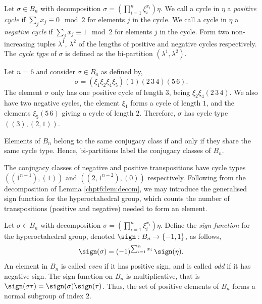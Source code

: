 \documentclass[11pt]{report}
\begin{document}
\begin{defn}
	Let $\sigma \in B_{n}$ with decomposition $\sigma = \left(\prod_{i=1}^{n} \xi_{i}^{x_{i}}\right) \eta$. We call a cycle in $\eta$ a \emph{positive cycle} if $\sum_{j}x_{j} \equiv 0 \mod 2$ for elements $j$ in the cycle. We call a cycle in $\eta$ a \emph{negative cycle} if $\sum_{j}x_{j} \equiv 1\mod 2$ for elements $j$ in the cycle.
	Form two non-increasing tuples $\lambda^{1}$, $\lambda^{2}$ of the lengths of positive and negative cycles respectively. The \emph{cycle type} of $\sigma$ is defined as the bi-partition $(\lambda^{1},\lambda^{2})$.
\end{defn}

\begin{example}
	Let $n =6$ and consider $\sigma \in B_{6}$ as defined by,
	\[\sigma =	\left(\xi_{1}\xi_{2} \xi_{4} \xi_{5} \right) (1)(2 \, 3 \, 4) (5 \, 6).\]
	The element $\sigma$ only has one positive cycle of length $3$, being $\xi_{2}\xi_{4} (2 \, 3 \, 4)$. We also have two negative cycles, the element $\xi_{1}$ forms a cycle of length $1$, and the elements $\xi_{5}(5 \,6)$ giving a cycle of length $2$. Therefore, $\sigma$ has cycle type $((3),(2,1))$.
\end{example}


\begin{lemma}
	Elements of $B_{n}$ belong to the same conjugacy class if and only if they share the same cycle type. Hence, bi-partitions label the conjugacy classes of $B_{n}$.
\end{lemma}

The conjugacy classes of negative and positive transpositions have cycle types $((1^{n-1}),(1))$ and  $((2,1^{n-2}),(0))$ respectively.
Following from the decomposition of Lemma \ref{chpt6:lem:decom}, we may introduce the generalised sign function for the hyperoctahedral group, which counts the number of transpositions (positive and negative) needed to form an element.
\begin{defn}
	Let $\sigma \in B_{n}$ with decomposition $ \sigma = \left(\prod_{i=1}^{n} \xi_{i}^{x_{i}} \right) \eta$. Define the  \emph{sign function} for the hyperoctahedral group, denoted $\sign:B_{n} \to \{-1,1\}$, as follows,
	\[\sign(\sigma) = (-1)^{\sum_{i=1}^{n}x_{i}} \, \sign(\eta).\]
	An element in $B_{n}$ is called \emph{even} if it has positive sign, and is called \emph{odd} if it has negative sign. The sign function on $B_{n}$ is multiplicative, that is $\sign(\sigma \tau) = \sign(\sigma) \sign(\tau)$. Thus, the set of positive elements of $B_{n}$ forms a normal subgroup of index $2$.
\end{defn}
\end{document}
